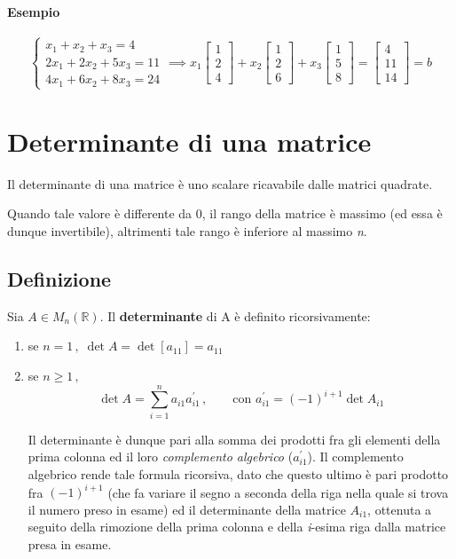 			\paragraph{Esempio}
			$$
			\begin{cases}
				x_1 + x_2 + x_3 = 4 \\
				2x_1 + 2x_2 + 5x_3 = 11 \\
				4x_1 + 6x_2 + 8x_3 = 24 
			\end{cases}
			\implies x_1 \begin{bmatrix}
				1 \\
				2 \\
				4
			\end{bmatrix} +  x_2 \begin{bmatrix}
				1 \\
				2 \\
				6
			\end{bmatrix} +  x_3 \begin{bmatrix}
				1 \\
				5 \\
				8
			\end{bmatrix} =  \begin{bmatrix}
				4 \\
				11 \\
				14
			\end{bmatrix} = b
			$$
		
	
	
	\section{Determinante di una matrice}
		Il determinante di una matrice è uno scalare ricavabile dalle matrici quadrate.
		
		Quando tale valore è differente da 0, il rango della matrice è massimo (ed essa è dunque invertibile), altrimenti tale rango è inferiore al massimo \textit{n}.
		
		\subsection{Definizione} Sia $A \in M_n (\mathbb{R})$. Il \textbf{determinante} di A è definito ricorsivamente:
			\begin{enumerate}
				\item se $n = 1\, , \; \det A = \det [a_{11}] = a_{11} $
				\item se $n \ge 1\, , $  
				$$ \det A = \sum_{i=1}^{n} a_{i1} a_{i1}^{\prime} \, , \qquad \text{con } a_{i1}^{\prime} = (-1)^{i + 1} \det A_{i1} $$
	
				Il determinante è dunque pari alla somma dei prodotti fra gli elementi della prima colonna ed il loro \emph{complemento algebrico} ($a_{i1}^{\prime}$). Il complemento algebrico rende tale formula ricorsiva, dato che questo ultimo è pari prodotto fra $(-1)^{i + 1}$ (che fa variare il segno a seconda della riga nella quale si trova il numero preso in esame) ed il determinante della matrice $A_{i1}$, ottenuta a seguito della rimozione della prima colonna e della \textit{i}-esima riga dalla matrice presa in esame.
			\end{enumerate}
	
